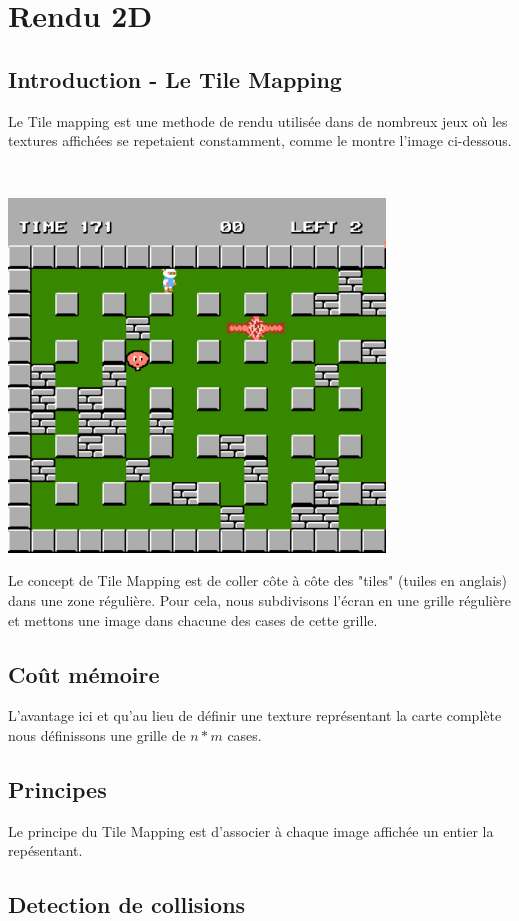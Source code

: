 \documentclass{report}
\begin{document}
\section{Rendu 2D}

	\subsection{Introduction - Le Tile Mapping}
	
		Le Tile mapping est une methode de rendu utilisée dans de nombreux jeux où les textures affichées
		se repetaient constamment, comme le montre l'image ci-dessous.
		
		$\,$
		
		\begin{center}
			\includegraphics[width=10cm]{./img/bomberman.png}		
		\end{center}
		
		Le concept de Tile Mapping est de coller côte à côte des "tiles" (tuiles en anglais) dans une zone régulière.
		Pour cela, nous subdivisons l'écran en une grille régulière et mettons une image dans chacune des cases de cette grille.
	
	\subsection{Coût mémoire}
		
		L'avantage ici et qu'au lieu de définir une texture représentant la carte complète nous définissons une grille de $n*m$ cases.
	
	\subsection{Principes}
	
		
		Le principe du Tile Mapping est d'associer à chaque image affichée un entier la repésentant.
		

	\subsection{Detection de collisions}
\end{document}

